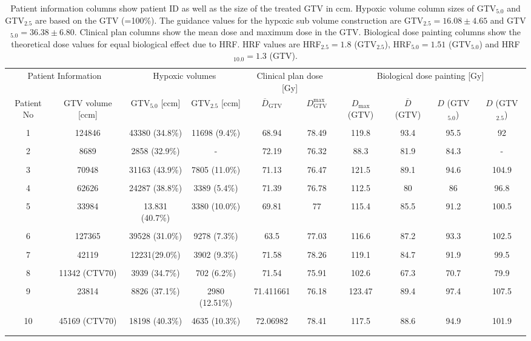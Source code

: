 \begin{sidewaystable}[p]
\centering
\footnotesize
\begin{tabular}{cccccccccc}
\toprule
\multicolumn{2}{c}{Patient Information} & \multicolumn{2}{c}{Hypoxic volumes} & \multicolumn{2}{c}{Clinical plan dose [Gy]} &  \multicolumn{4}{c}{Biological dose painting [Gy]}\\
\cmidrule(r){1-2} \cmidrule(r){3-4}\cmidrule(r){5-6}\cmidrule(r){7-10}
Patient No & GTV volume [ccm] & GTV$_{5.0}$ [ccm]& GTV$_{2.5}$ [ccm] & $\overline D_\mathrm{GTV}$ & $D_\mathrm{GTV}^\mathrm{max} $ & $D_\mathrm{max}$ (GTV) &  $\overline D$ (GTV) & $D$ (GTV$_{5.0}$) & $D$ (GTV$_{2.5}$)\\
\midrule\\
1	&	124846	&	43380 (34.8\%)	&	11698 (9.4\%)	&	68.94	&	78.49	&	119.8	&	93.4	&	95.5	&	92	\\\\
2	&	8689	&	2858 (32.9\%)	&	-	&	72.19	&	76.32	&	88.3	&	81.9	&	84.3	&	-	\\\\
3	&	70948	&	31163 (43.9\%)	&	7805 (11.0\%)	&	71.13	&	76.47	&	121.5	&	89.1	&	94.6	&	104.9	\\\\
4	&	62626	&	24287 (38.8\%)	&	3389 (5.4\%)	&	71.39	&	76.78	&	112.5	&	80	&	86	&	96.8	\\\\
5	&	33984	&	13.831 (40.7\%)	&	3380 (10.0\%)	&	69.81	&	77	&	115.4	&	85.5	&	91.2	&	100.5	\\\\
6	&	127365	&	39528 (31.0\%)	&	9278 (7.3\%)	&	63.5	&	77.03	&	116.6	&	87.2	&	93.3	&	102.5	\\\\
7	&	42119	&	12231(29.0\%)	&	3902 (9.3\%)	&	71.58	&	78.26	&	119.1	&	84.7	&	91.9	&	99.5	\\\\
8	&	11342 (CTV70)	&	3939 (34.7\%)	&	702 (6.2\%)	&	71.54	&	75.91	&	102.6	&	67.3	&	70.7	&	79.9	\\\\
9	&	23814	&	8826 (37.1\%)	&	2980 (12.51\%)	&	71.411661	&	76.18	&	123.47	&	89.4	&	97.4	&	107.5	\\\\
10	&	45169 (CTV70)	&	18198 (40.3\%)	&	4635 (10.3\%)	&	72.06982	&	78.41	&	117.5	&	88.6	&	94.9	&	101.9	\\\\
\bottomrule\\
\end{tabular}
\caption{Patient information columns show patient ID as well as the size of the treated GTV in ccm. Hypoxic volume column sizes of GTV$_{5.0}$ and GTV$_{2.5}$ are based on the GTV (=100\%). The guidance values for the hypoxic sub volume construction are GTV$_{2.5}=16.08\pm 4.65$ and GTV$_{5.0}=36.38\pm 6.80$. Clinical plan columns show the mean dose and maximum dose in the GTV. Biological dose painting columns show the theoretical dose values for equal biological effect due to HRF. HRF values are HRF$_{2.5}=1.8$ (GTV$_{2.5}$), HRF$_{5.0}=1.51$ (GTV$_{5.0}$) and HRF$_{10.0}=1.3$ (GTV).}
\label{tab:patientgtv}
\end{sidewaystable}
